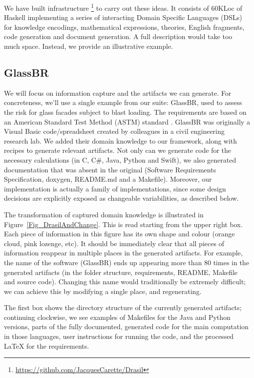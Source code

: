 \documentclass[a4paper,UKenglish,cleveref,autoref,thm-restate]{oasics-v2021}
\newcommand{\CC}{C\nolinebreak\hspace{-.05em}\raisebox{.4ex}{\small\bf +}\nolinebreak\hspace{-.10em}\raisebox{.4ex}{\small\bf +}}
\begin{document}
We have built infrastructure%
\footnote{\url{https://github.com/JacquesCarette/Drasil}} 
to carry out these ideas. It consists of 60KLoc of Haskell
implementing a series of interacting Domain Specific Languages (DSLs) for
knowledge encodings, mathematical expressions, theories, English fragments,
code generation and document generation.  A full description would take too
much space.  Instead, we provide an illustrative example.

\subsection{GlassBR}
We will focus on information capture and the artifacts we can generate. For
concreteness, we'll use a single example from our suite: GlassBR, used to assess
the risk for glass facades subject to blast loading. The requirements are based
on an American Standard Test Method (ASTM) standard \cite{ASTM2009, ASTM2015,
BeasonEtAl1998}. GlassBR was originally a Visual Basic code/spreadsheet
created by colleagues in a civil engineering research lab.  We added their
domain knowledge to our framework, along with recipes to generate relevant
artifacts.  Not only can we generate code for the necessary calculations (in
\CC, C\#, Java, Python and Swift), we also generated documentation that was absent in the
original (Software Requirements Specification, doxygen, README.md and a
Makefile). Moreover, our implementation is actually a family of implementations,
since some design decisions are explicitly exposed as changeable variabilities,
as described below.

The transformation of captured domain knowledge is illustrated in
Figure~\ref{Fig_DrasilAndChange}. This is read starting from the upper right
box. Each piece of information in this figure has its own shape and colour
(orange cloud, pink lozenge, etc). It should be immediately clear that all
pieces of information reappear in multiple places in the generated artifacts.
For example, the name of the software (GlassBR) ends up appearing more than 80
times in the generated artifacts (in the folder structure, requirements, README,
Makefile and source code). Changing this name would traditionally be extremely
difficult; we can achieve this by modifying a single place, and regenerating.

The first box shows the directory structure of the currently generated
artifacts; continuing clockwise, we see examples of Makefiles for the Java and
Python versions, parts of the fully documented, generated code for the main
computation in those languages, user instructions for running the code, and the
processed \LaTeX{} for the requirements.
\end{document}

